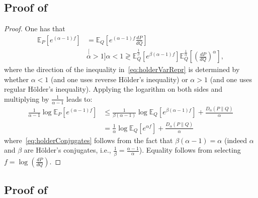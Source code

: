 \documentclass{article}
\numberwithin{theorem}{section}
\numberwithin{example}{section}
\numberwithin{remark}{section}
\numberwithin{definition}{section}
\begin{document}
\subsection{Proof of~}\label{app:lemma-variationalRenyiDivProof}
\begin{proof}
One has that
\begin{align} \mathbb{E}_P\left[e^{(\alpha-1)f}\right] &= \mathbb{E}_Q\left[e^{(\alpha-1)f}\frac{dP}{dQ}\right] \\ & \stackrel[\alpha>1]{\alpha<1}{\gtrless} \mathbb{E}^\frac1\beta_Q\left[e^{\beta(\alpha-1)f}\right]\mathbb{E}^\frac1\alpha_Q\left[\left(\frac{dP}{dQ}\right)^\alpha\right] ,\label{eq:holderVarRepr}
\end{align}
where the direction of the inequality in~\cref{eq:holderVarRepr} is determined by whether $\alpha<1$ (and one uses reverse H\"older's inequality) or $\alpha > 1$ (and one uses regular H\"older's inequality). Applying the logarithm on both sides and multiplying by $\frac{1}{\alpha-1}$ leads to:
\begin{align}
    \frac{1}{\alpha-1} \log \mathbb{E}_P\left[e^{(\alpha-1)f}\right] &\leq \frac{1}{\beta(\alpha-1)}\log\mathbb{E}_Q\left[e^{\beta(\alpha-1)f}\right] +\frac{D_\alpha(P\|Q)}{\alpha} \\
    &= \frac{1}{\alpha}\log\mathbb{E}_Q\left[e^{\alpha f}\right] +\frac{D_\alpha(P\|Q)}{\alpha}\label{eq:holderConjugates}
\end{align}
where~\cref{eq:holderConjugates} follows from the fact that $\beta(\alpha-1)=\alpha$ (indeed $\alpha$ and $\beta$ are H\"older's conjugates, i.e., $\frac1\beta = \frac{\alpha-1}{\alpha}$). Equality follows from selecting $f=\log\left(\frac{dP}{dQ}\right)$.
\end{proof}


\subsection{Proof of~}\label{app:proof:thm:Ialpha}
\end{document}
